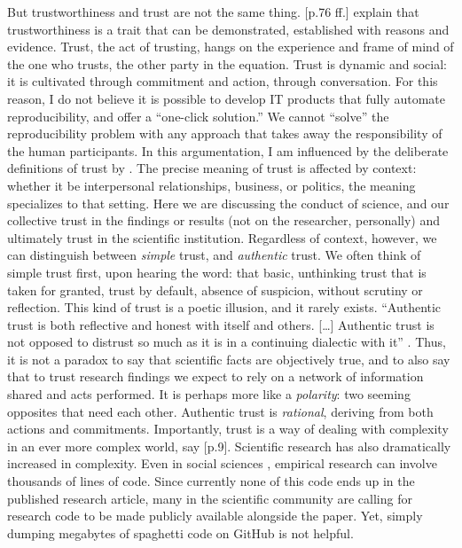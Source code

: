 \documentclass{statement}
\newlength{\up}
\begin{document}
But trustworthiness and trust are not the same thing. 
\cite{solomon-flores2003} [p.76 ff.] explain that trustworthiness is a trait that can be demonstrated, established with reasons and evidence. 
Trust, the act of trusting, hangs on the experience and frame of mind of the one who trusts, the other party in the equation. 
Trust is dynamic and social: it is cultivated through commitment and action, through conversation. 
For this reason, I do not believe it is possible to develop IT products that fully automate reproducibility, and offer a ``one-click solution.'' 
We cannot ``solve'' the reproducibility problem with any approach that takes away the responsibility of the human participants. 
In this argumentation, I am influenced by the  deliberate definitions of trust by \cite{solomon-flores2003}. 
The precise meaning of trust is affected by context: whether it be interpersonal relationships, business, or politics, the meaning specializes to that setting. 
Here we are discussing the conduct of science, and our collective trust in the findings or results (not on the researcher, personally) and ultimately trust in the scientific institution. 
Regardless of context, however, we can distinguish between \emph{simple} trust, and \emph{authentic} trust. 
We often think of simple trust first, upon hearing the word: that basic, unthinking trust that is taken for granted, trust by default, absence of suspicion, without scrutiny or reflection. 
This kind of trust is a poetic illusion, and it rarely exists. 
``Authentic trust is both reflective and honest with itself and others. […] Authentic trust is not opposed to distrust so much as it is in a continuing dialectic with it'' \citep[p.92]{solomon-flores2003}. 
Thus, it is not a paradox to say that scientific facts are objectively true, and to also say that to trust research findings we expect to rely on a network of information shared and acts performed. 
It is perhaps more like a \emph{polarity}: two seeming opposites that need each other. 
Authentic trust is \emph{rational}, deriving from both actions and commitments. 
Importantly, trust is a way of dealing with complexity in an ever more complex world, say \cite{solomon-flores2003} [p.9]. 
Scientific research has also dramatically increased in complexity. 
Even in social sciences \citep{christensenETal2019}, empirical research can involve thousands of lines of code. 
Since currently none of this code ends up in the published research article, many in the scientific community are calling for research code to be made publicly available alongside the paper. 
Yet, simply dumping megabytes of spaghetti code on GitHub is not helpful. 
\end{document}
